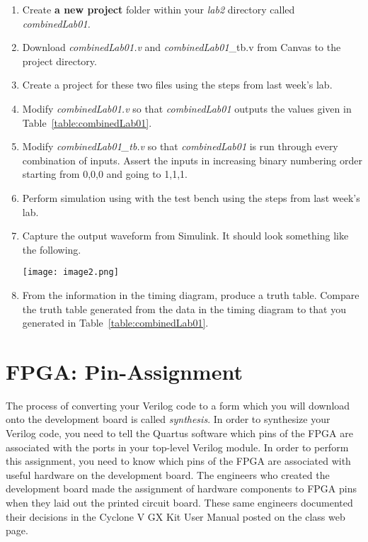 \begin{enumerate}
\def\labelenumi{\arabic{enumi}.}
\item
  Create \textbf{a new project} folder within your \emph{lab2} directory
  called \emph{combinedLab01.}
\item
  Download \emph{combinedLab01.v} and \emph{combinedLab01}\_tb.v from
  Canvas to the project directory.
\item
  Create a project for these two files using the steps from last week's
  lab. 
\item
  Modify \emph{combinedLab01.v} so that \emph{combinedLab01} outputs the
  values given in Table~\ref{table:combinedLab01}.
\item
  Modify \emph{combinedLab01\_tb.v} so that \emph{combinedLab01} is run
  through every combination of inputs. Assert the inputs in increasing
  binary numbering order starting from 0,0,0 and going to 1,1,1.
\item
  Perform simulation using with the test bench using the steps from last
  week's lab. 
  
\item
  \protect\hypertarget{CombinedLab01_Waveform}{}{}Capture the output
  waveform from Simulink. It should look something like the following.

\texttt{[image: image2.png]}

\item
  From the information in the timing diagram, produce a truth table.
  Compare the truth table generated from the data in the timing 
  diagram to that you generated in Table~\ref{table:combinedLab01}.
\end{enumerate}

\section{FPGA: Pin-Assignment}

The process of converting your Verilog code to a form which you will
download onto the development board is called \emph{synthesis}. In order
to synthesize your Verilog code, you need to tell the Quartus software
which pins of the FPGA are associated with the ports in your top-level
Verilog module. In order to perform this assignment, you need to know
which pins of the FPGA are associated with useful hardware on the
development board. The engineers who created the development board made
the assignment of hardware components to FPGA pins when they laid out
the printed circuit board. These same engineers documented their
decisions in the Cyclone V GX Kit User Manual posted on the class web
page.


